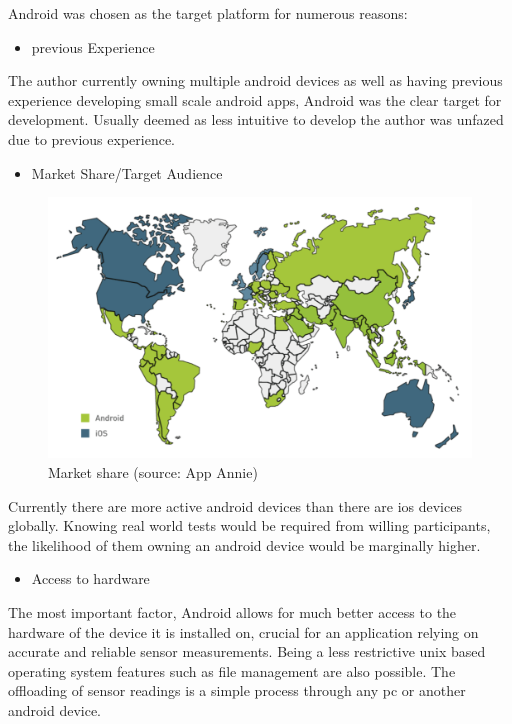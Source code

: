 Android was chosen as the target platform for numerous reasons:
\begin{itemize}
\item previous Experience 
\end{itemize}
The author currently owning multiple android devices as well as having previous experience developing small scale android apps, Android was the clear target for development.  Usually deemed as less intuitive to develop the author was unfazed due to previous experience.

\vspace{2cm}

\begin{itemize}
\item Market Share/Target Audience 
\end{itemize}
\begin{figure}
\begin{center}
\includegraphics[scale = 0.4] {implementation/marketshare.png}
\end{center}
\caption{Market share (source: App Annie)}
\label{MAP}
\end{figure}

Currently there are more active android devices than there are ios devices globally. Knowing real world tests would be required from willing participants, the likelihood of them owning an android device would be marginally higher.
\begin{itemize}
\item Access to hardware
\end{itemize}

The most important factor, Android allows for much better access to the hardware of the device it is installed on, crucial for an application relying on accurate and reliable sensor measurements. Being a less restrictive unix based operating system features such as file management are also possible. The offloading of sensor readings is a simple process through any pc or another android device.


